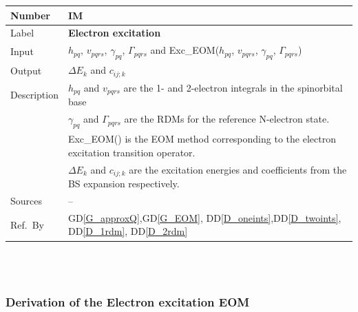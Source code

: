 \documentclass[12pt]{article}
\newcommand{\colAwidth}{0.13\textwidth}
\newcommand{\colBwidth}{0.82\textwidth}
\newcommand{\dref}[1]{GD\ref{#1}}
\newcommand{\ddref}[1]{DD\ref{#1}}
\newcounter{instnum} %
\begin{document}

\noindent
\begin{minipage}{\textwidth}
	\renewcommand*{\arraystretch}{1.5}
	\begin{tabular}{| p{\colAwidth} | p{\colBwidth}|}
		\hline
		\rowcolor[gray]{0.9}
		Number& IM{instnum}\theinstnum \label{IM_Exc}\\
		\hline
		Label& \bf Electron excitation\\
		\hline
		Input&$h_{pq}$, $v_{pqrs}$, $\gamma_{pq}$, $\Gamma_{pqrs}$ and 
		Exc\_EOM($h_{pq}$, $v_{pqrs}$, $\gamma_{pq}$, $\Gamma_{pqrs}$)\\
		\hline
		Output&$\Delta E_k$ and $c_{ij;k}$\\
		\hline
		Description& $h_{pq} $ and $ v_{pqrs}$ are the 1- and 2-electron 
		integrals in 
		the spinorbital base\\
		& $\gamma_{pq}$ and $\Gamma_{pqrs}$ are the RDMs for the reference 
		N-electron 
		state.\\
		& Exc\_EOM() is the EOM method corresponding to the electron excitation 
		transition operator.\\
		&$\Delta E_k$ and $c_{ij;k}$ are the excitation energies and 
		coefficients from the BS expansion respectively.\\
		\hline
		Sources& -- \\
		\hline
		Ref.\ By & \dref{G_approxQ},\dref{G_EOM},  
		\ddref{D_oneints},\ddref{D_twoints}, \ddref{D_1rdm}, 
		\ddref{D_2rdm}\\
		\hline
	\end{tabular}
\end{minipage}\\

~\newline

\subsubsection*{Derivation of the Electron excitation EOM}
\end{document}
